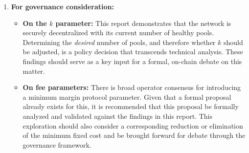 \documentclass[11pt, letterpaper]{article}
\begin{document}
\begin{enumerate}
	\item \textbf{For governance consideration:}
	      \begin{itemize}
		      \item \textbf{On the $k$ parameter:} This report demonstrates that the network is securely decentralized
		            with its current number of healthy pools. Determining the \textit{desired} number of pools, and therefore
		            whether $k$ should be adjusted, is a policy decision that transcends technical analysis. These findings
		            should serve as a key input for a formal, on-chain debate on this matter.
		      \item \textbf{On fee parameters:} There is broad operator consensus for introducing a minimum margin
		            protocol parameter. Given that a formal proposal already exists for this, it is recommended that this
		            proposal be formally analyzed and validated against the findings in this report. This exploration should
		            also consider a corresponding reduction or elimination of the minimum fixed cost and be brought forward for debate
		            through the governance framework.
	      \end{itemize}


\end{enumerate}
\end{document}
